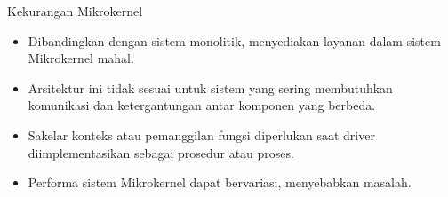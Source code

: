 \documentclass[aspectratio=169, table]{beamer}
\begin{document}
    \begin{frame}{Kekurangan Mikrokernel}

        \begin{itemize}
            \item Dibandingkan dengan sistem monolitik, menyediakan layanan dalam sistem Mikrokernel mahal.

            \item Arsitektur ini tidak sesuai untuk sistem yang sering membutuhkan komunikasi dan ketergantungan antar komponen yang berbeda.

            \item Sakelar konteks atau pemanggilan fungsi diperlukan saat driver diimplementasikan sebagai prosedur atau proses.

            \item Performa sistem Mikrokernel dapat bervariasi, menyebabkan masalah.
        \end{itemize}
    \end{frame}
\end{document}
